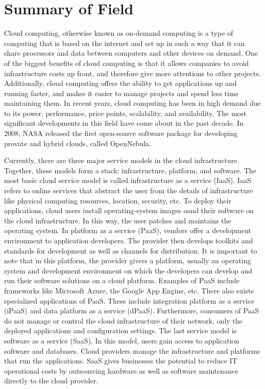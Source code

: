 \documentclass[a4paper, 8pt]{article} %
\begin{document}

\iffalse
\section*{Summary of Field}

Cloud computing, otherwise known as on-demand computing is a type of computing that is based on the internet and set up in such a way that it can share processors and data between computers and other devices on demand.  One of the biggest benefits of cloud computing is that it allows companies to avoid infrastructure costs up front, and therefore give more attentions to other projects.  Additionally, cloud computing offers the ability to get applications up and running faster, and makes it easier to manage projects and spend less time maintaining them.  In recent years, cloud computing has been in high demand due to its power, performance, price points, scalability, and availability.  The most significant developments in this field have come about in the past decade.  In 2008, NASA released the first open-source software package for developing provate and hybrid clouds, called OpenNebula.  

Currently, there are three major service models in the cloud infrastructure.  Together, these models form a stack: infrastructure, platform, and software.  The most basic cloud service model is called infrastructure as a service (IaaS).  IaaS refers to online services that abstract the user from the details of infrastructure like physical computing resources, location, security, etc.  To deploy their applications, cloud users install operating-system images oand their software on the cloud infrastructure.  In this way, the user patches and maintains the operating system.  In platform as a service (PaaS), vendors offer a development environment to application developers.  The provider then develops toolkits and standards for development as well as channels for distribution.  It is important to note that in this platform, the provider givers a platform, usually an operating system and development environment on which the developers can develop and run their software solutions on a cloud platform.  Examples of PaaS include frameworks like Microsoft Azure, the Google App Engine, etc.  There also exists specialized applications of PaaS.  These include integration platform as a service (iPaaS) and data platform as a service (dPaaS).  Furthermore, consumers of PaaS do not manage or control the cloud infrastructure of their network, only the deployed applications and configuration settings.  The last service model is software as a service (SaaS).  In this model, users gain access to application software and databases.  Cloud providers manage the infrastructure and platforms that run the applications.  SaaS gives businesses the potential to reduce IT operational costs by outsourcing hardware as well as software maintenance directly to the cloud provider.  
\end{document}
